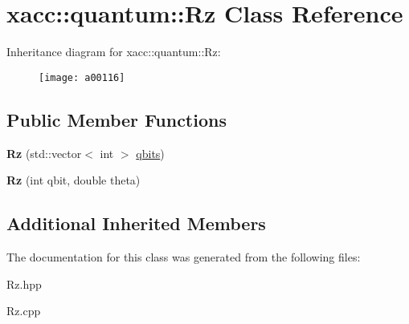 \hypertarget{a00116}{}\section{xacc\+:\+:quantum\+:\+:Rz Class Reference}
\label{a00116}
Inheritance diagram for xacc\+:\+:quantum\+:\+:Rz\+:\begin{figure}[H]
\begin{center}
\leavevmode
\texttt{[image: a00116]}
\end{center}
\end{figure}
\subsection*{Public Member Functions}
\begin{DoxyCompactItemize}
\item 
{\bfseries Rz} (std\+::vector$<$ int $>$ \hyperlink{a00062_a2a56be6c2519ea65df4d06f4abae1393}{qbits})\hypertarget{a00116_a7ce912c7f9c9e8f4e7e60f9dba95538b}{}\label{a00116_a7ce912c7f9c9e8f4e7e60f9dba95538b}

\item 
{\bfseries Rz} (int qbit, double theta)\hypertarget{a00116_ae30eaf75feb8f896c22043629d21b834}{}\label{a00116_ae30eaf75feb8f896c22043629d21b834}

\end{DoxyCompactItemize}
\subsection*{Additional Inherited Members}


The documentation for this class was generated from the following files\+:\begin{DoxyCompactItemize}
\item 
Rz.\+hpp\item 
Rz.\+cpp\end{DoxyCompactItemize}
